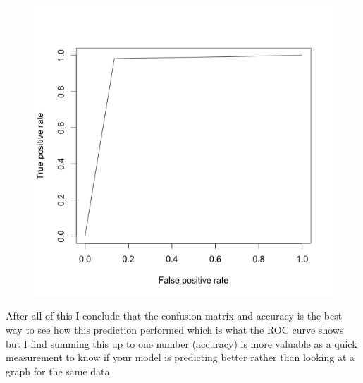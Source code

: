\documentclass[10pt]{article}
\begin{document}
\begin{figure}[!h]
\includegraphics[scale=0.37]{sd_roc.png}
\centering
\end{figure}

After all of this I conclude that the confusion matrix and accuracy is the best way to see how this prediction performed which is what the ROC curve shows but I find summing this up to one number (accuracy) is more valuable as a quick measurement to know if your model is predicting better rather than looking at a graph for the same data.  
\end{document}
